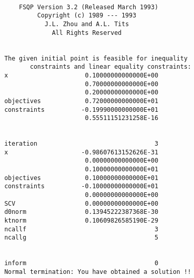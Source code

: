 \begin{verbatim}

                   FSQP Version 3.2 (Released March 1993)
                        Copyright (c) 1989 --- 1993         
                          J.L. Zhou and A.L. Tits           
                            All Rights Reserved 
              
              
               The given initial point is feasible for inequality
                      constraints and linear equality constraints:
               x                     0.10000000000000E+00
                                     0.70000000000000E+00
                                     0.20000000000000E+00
               objectives            0.72000000000000E+01
               constraints          -0.19990000000000E+01
                                     0.55511151231258E-16


               iteration                                3
               x                    -0.98607613152626E-31
                                     0.00000000000000E+00
                                     0.10000000000000E+01
               objectives            0.10000000000000E+01
               constraints          -0.10000000000000E+01
                                     0.00000000000000E+00
               SCV                   0.00000000000000E+00
               d0norm                0.13945222387368E-30
               ktnorm                0.10609826585190E-29
               ncallf                                   3
               ncallg                                   5


               inform                                   0
               Normal termination: You have obtained a solution !!
\end{verbatim}

